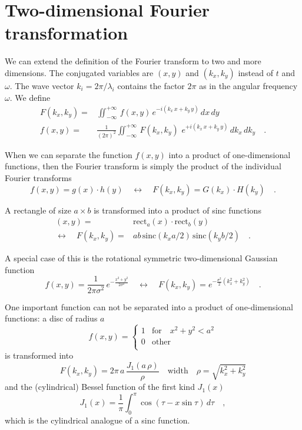 \section{Two-dimensional Fourier transformation}

We can extend the definition of the Fourier transform to two and more dimensions. The conjugated variables are $(x,y)$ and $(k_x, k_y)$ instead of $t$ and $\omega$. The wave vector $k_i = 2\pi / \lambda_i$ contains the factor $2\pi$ as in the angular frequency $\omega$. We define
\begin{align}
  F(k_x, k_y) = & \iint_{-\infty}^{+\infty} \, f(x,y) \, e^{- i (k_x \, x + k_y \, y )} \, dx \, dy \\
  f(x,y) = & \frac{1}{(2 \pi )^2} \iint_{-\infty}^{+\infty} \, F(k_x, k_y) \,\, e^{+ i (k_x \, x + k_y \, y )}  \, dk_x \,dk_y \quad .
 \end{align}

When we can separate the function $f(x,y)$ into a product of one-dimensional functions, then  the Fourier transform is simply the product of the individual Fourier transforms
\begin{equation}
  f(x,y) = g(x) \cdot h(y) \quad \leftrightarrow \quad 
  F(k_x, k_y) = G(k_x) \cdot H(k_y) \quad .
\end{equation}

A rectangle of size $a \times b$ is transformed into a product of sinc functions
\begin{align}
  (x,y) = & \text{rect} _a (x) \cdot \text{rect} _b (y) \\
  \leftrightarrow \quad  F(k_x, k_y) = & a b \, \text{sinc}( k_x a /2) \, \text{sinc}( k_y b /2) \quad .
\end{align}


A special case of this is the rotational symmetric two-dimensional Gaussian function
\begin{equation}
  f(x,y) = 
  \frac{1}{2 \pi \sigma^2} \, e^{-  \frac{x^2 + y^2}{2 \sigma^2} }
  \quad \leftrightarrow \quad 
  F(k_x, k_y) = e^{- \frac{\sigma^2 }{2} \left(k_x^2 + k_y^2 \right)  } \quad .
\end{equation}

One important function can not be separated into a product of one-dimensional functions: a disc of radius $a$
    \begin{equation}
    f(x,y)  = \left\{ 
    \begin{array}{ll}
    1 & \text{for} \quad x^2+y^2 < a^2 \\
    0 & \text{other} \\
    \end{array}
    \right.
   \end{equation}
is transformed into 
\begin{equation}
  F(k_x, k_y) = 2 \pi \, a \, \frac{J_1( a \, \rho )}{\rho}
  \quad \text{width} \quad \rho = \sqrt{k_x^2 + k_y^2}
\end{equation}
and the (cylindrical) Bessel function of the first kind $J_1(x)$
\begin{equation}
  J_1(x) = \frac{1}{\pi} \int_0^\pi \cos (\tau - x \sin \tau) \,d\tau \quad ,
\end{equation}
which is the cylindrical analogue of a sinc function.


